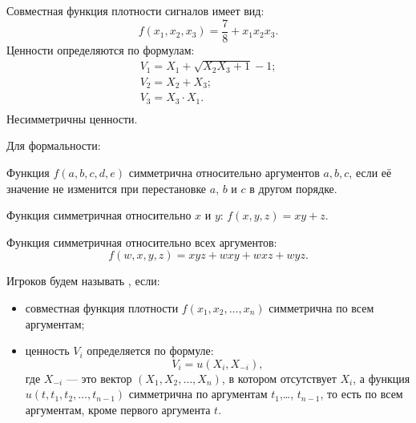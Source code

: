 \begin{myex} Совместная функция плотности сигналов имеет вид:
\begin{equation}
f(x_{1},x_{2},x_{3})=\frac{7}{8}+x_{1}x_{2}x_{3}.
\end{equation}
Ценности определяются по формулам:
\begin{equation}
\begin{array}{c}
V_{1}=X_{1}+\sqrt{X_{2}X_{3}+1}-1; \\
V_{2}=X_{2}+X_{3}; \\
V_{3}=X_{3}\cdot X_{1}. \\
\end{array}
\end{equation}
Несимметричны ценности.
\end{myex}

Для формальности:
\begin{mydef}
Функция $ f(a,b,c,d,e) $ симметрична относительно аргументов $ a,b,c $, если её значение не изменится при перестановке $ a$, $b$  и $c$ в другом порядке.
\end{mydef}

\begin{myex} Функция симметричная относительно $ x $ и $ y $: $f(x,y,z)=xy+z$.
\end{myex}

\begin{myex} Функция симметричная относительно всех аргументов:
\[
f(w,x,y,z)=xyz+wxy+wxz+wyz.
\]
\end{myex}


\begin{mydef} Игроков будем называть , если:
\begin{itemize}
\item совместная функция плотности $ f(x_{1},x_{2},\ldots,x_{n}) $ симметрична по всем аргументам;
\item ценность $V_{i}$ определяется по формуле:
\begin{equation}
V_{i}=u(X_{i},X_{-i}),
\end{equation}
где $X_{-i}  $ — это вектор $ (X_{1},X_{2},\ldots,X_{n}) $, в котором отсутствует $ X_{i} $, а  функция $ u(t,t_{1},t_{2},\ldots,t_{n-1}) $ симметрична по аргументам $ t_{1} $,\ldots, $ t_{n-1} $, то есть по всем аргументам, кроме первого аргумента $ t $.
\end{itemize}
\end{mydef}


